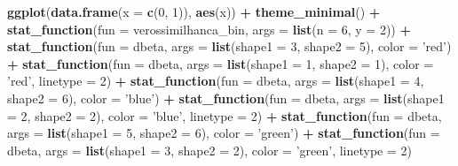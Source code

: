 \documentclass[]{book}
\newenvironment{Shaded}{\begin{snugshade}}{\end{snugshade}}
\newcommand{\DataTypeTok}[1]{\textcolor[rgb]{0.13,0.29,0.53}{#1}}
\newcommand{\DecValTok}[1]{\textcolor[rgb]{0.00,0.00,0.81}{#1}}
\newcommand{\KeywordTok}[1]{\textcolor[rgb]{0.13,0.29,0.53}{\textbf{#1}}}
\newcommand{\NormalTok}[1]{#1}
\newcommand{\OperatorTok}[1]{\textcolor[rgb]{0.81,0.36,0.00}{\textbf{#1}}}
\newcommand{\StringTok}[1]{\textcolor[rgb]{0.31,0.60,0.02}{#1}}
\begin{document}
\begin{Shaded}
\begin{Highlighting}[]
\KeywordTok{ggplot}\NormalTok{(}\KeywordTok{data.frame}\NormalTok{(}\DataTypeTok{x =} \KeywordTok{c}\NormalTok{(}\DecValTok{0}\NormalTok{, }\DecValTok{1}\NormalTok{)), }\KeywordTok{aes}\NormalTok{(x)) }\OperatorTok{+}\StringTok{ }
\StringTok{  }\KeywordTok{theme_minimal}\NormalTok{() }\OperatorTok{+}
\StringTok{  }\KeywordTok{stat_function}\NormalTok{(}\DataTypeTok{fun =}\NormalTok{ verossimilhanca_bin, }\DataTypeTok{args =} \KeywordTok{list}\NormalTok{(}\DataTypeTok{n =} \DecValTok{6}\NormalTok{, }\DataTypeTok{y =} \DecValTok{2}\NormalTok{)) }\OperatorTok{+}\StringTok{ }
\StringTok{  }\KeywordTok{stat_function}\NormalTok{(}\DataTypeTok{fun =}\NormalTok{ dbeta, }\DataTypeTok{args =} \KeywordTok{list}\NormalTok{(}\DataTypeTok{shape1 =} \DecValTok{3}\NormalTok{, }\DataTypeTok{shape2 =} \DecValTok{5}\NormalTok{), }
                \DataTypeTok{color =} \StringTok{'red'}\NormalTok{) }\OperatorTok{+}
\StringTok{  }\KeywordTok{stat_function}\NormalTok{(}\DataTypeTok{fun =}\NormalTok{ dbeta, }\DataTypeTok{args =} \KeywordTok{list}\NormalTok{(}\DataTypeTok{shape1 =} \DecValTok{1}\NormalTok{, }\DataTypeTok{shape2 =} \DecValTok{1}\NormalTok{), }
                \DataTypeTok{color =} \StringTok{'red'}\NormalTok{, }\DataTypeTok{linetype =} \DecValTok{2}\NormalTok{) }\OperatorTok{+}\StringTok{ }
\StringTok{  }\KeywordTok{stat_function}\NormalTok{(}\DataTypeTok{fun =}\NormalTok{ dbeta, }\DataTypeTok{args =} \KeywordTok{list}\NormalTok{(}\DataTypeTok{shape1 =} \DecValTok{4}\NormalTok{, }\DataTypeTok{shape2 =} \DecValTok{6}\NormalTok{), }
                \DataTypeTok{color =} \StringTok{'blue'}\NormalTok{) }\OperatorTok{+}
\StringTok{  }\KeywordTok{stat_function}\NormalTok{(}\DataTypeTok{fun =}\NormalTok{ dbeta, }\DataTypeTok{args =} \KeywordTok{list}\NormalTok{(}\DataTypeTok{shape1 =} \DecValTok{2}\NormalTok{, }\DataTypeTok{shape2 =} \DecValTok{2}\NormalTok{), }
                \DataTypeTok{color =} \StringTok{'blue'}\NormalTok{, }\DataTypeTok{linetype =} \DecValTok{2}\NormalTok{) }\OperatorTok{+}\StringTok{ }
\StringTok{  }\KeywordTok{stat_function}\NormalTok{(}\DataTypeTok{fun =}\NormalTok{ dbeta, }\DataTypeTok{args =} \KeywordTok{list}\NormalTok{(}\DataTypeTok{shape1 =} \DecValTok{5}\NormalTok{, }\DataTypeTok{shape2 =} \DecValTok{6}\NormalTok{), }
                \DataTypeTok{color =} \StringTok{'green'}\NormalTok{) }\OperatorTok{+}
\StringTok{  }\KeywordTok{stat_function}\NormalTok{(}\DataTypeTok{fun =}\NormalTok{ dbeta, }\DataTypeTok{args =} \KeywordTok{list}\NormalTok{(}\DataTypeTok{shape1 =} \DecValTok{3}\NormalTok{, }\DataTypeTok{shape2 =} \DecValTok{2}\NormalTok{), }
                \DataTypeTok{color =} \StringTok{'green'}\NormalTok{, }\DataTypeTok{linetype =} \DecValTok{2}\NormalTok{)}
\end{Highlighting}
\end{Shaded}
\end{document}
